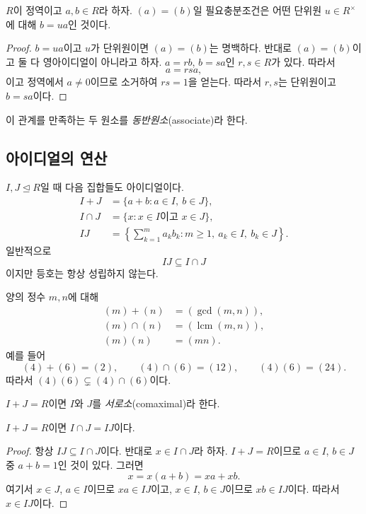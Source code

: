 \begin{proposition}
$R$이 정역이고 $a,b\in R$라 하자. $(a)=(b)$일 필요충분조건은 어떤 단위원 $u\in R^\times$에 대해 $b=ua$인 것이다.
\end{proposition}

\begin{proof}
$b=ua$이고 $u$가 단위원이면 $(a)=(b)$는 명백하다. 반대로 $(a)=(b)$이고 둘 다 영아이디얼이 아니라고 하자. $a=rb$, $b=sa$인 $r,s\in R$가 있다. 따라서
\[
  a=rsa,
\]
이고 정역에서 $a\ne0$이므로 소거하여 $rs=1$을 얻는다. 따라서 $r,s$는 단위원이고 $b=sa$이다.
\end{proof}

이 관계를 만족하는 두 원소를 \emph{동반원소}(associate)라 한다.

\subsection{아이디얼의 연산}

$I,J\trianglelefteq R$일 때 다음 집합들도 아이디얼이다.
\[
\begin{aligned}
 I+J&=\{a+b:a\in I,\ b\in J\},\\
 I\cap J&=\{x:x\in I\text{이고 }x\in J\},\\
 IJ&=\left\{\sum_{k=1}^m a_kb_k:m\ge1,\ a_k\in I,\ b_k\in J\right\}.
\end{aligned}
\]
일반적으로
\[
  IJ\subseteq I\cap J
\]
이지만 등호는 항상 성립하지 않는다.

\begin{example}
양의 정수 $m,n$에 대해
\[
\begin{aligned}
 (m)+(n)&=(\gcd(m,n)),\\
 (m)\cap(n)&=(\operatorname{lcm}(m,n)),\\
 (m)(n)&=(mn).
\end{aligned}
\]
예를 들어
\[
  (4)+(6)=(2),\qquad (4)\cap(6)=(12),\qquad (4)(6)=(24).
\]
따라서 $(4)(6)\subsetneq(4)\cap(6)$이다.
\end{example}

\begin{definition}
$I+J=R$이면 $I$와 $J$를 \emph{서로소}(comaximal)라 한다.
\end{definition}

\begin{proposition}
$I+J=R$이면 $I\cap J=IJ$이다.
\end{proposition}

\begin{proof}
항상 $IJ\subseteq I\cap J$이다. 반대로 $x\in I\cap J$라 하자. $I+J=R$이므로 $a\in I$, $b\in J$ 중 $a+b=1$인 것이 있다. 그러면
\[
  x=x(a+b)=xa+xb.
\]
여기서 $x\in J$, $a\in I$이므로 $xa\in IJ$이고, $x\in I$, $b\in J$이므로 $xb\in IJ$이다. 따라서 $x\in IJ$이다.
\end{proof}

